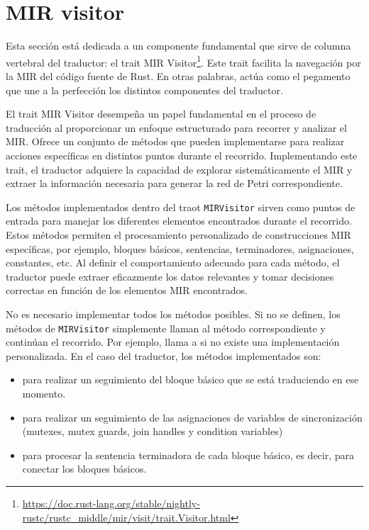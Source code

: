 \section{MIR visitor}

Esta sección está dedicada a un componente fundamental que sirve de columna vertebral del
traductor: el trait \acrshort{MIR} Visitor\footnote{\url{https://doc.rust-lang.org/stable/nightly-rustc/rustc_middle/mir/visit/trait.Visitor.html}}.
Este trait facilita la navegación por la \acrshort{MIR} del código
fuente de Rust. En otras palabras, actúa como el pegamento que une a la perfección los
distintos componentes del traductor.

El trait \acrshort{MIR} Visitor desempeña un papel fundamental en el proceso de traducción al
proporcionar un enfoque estructurado para recorrer y analizar el \acrshort{MIR}. Ofrece un conjunto de
métodos que pueden implementarse para realizar acciones específicas en distintos puntos
durante el recorrido. Implementando este trait, el traductor adquiere la capacidad de explorar
sistemáticamente el \acrshort{MIR} y extraer la información necesaria para generar la red de Petri
correspondiente.

Los métodos implementados dentro del traot \texttt{MIRVisitor} sirven como puntos de entrada
para manejar los diferentes elementos encontrados durante el recorrido. Estos métodos
permiten el procesamiento personalizado de construcciones \acrshort{MIR} específicas, por ejemplo,
bloques básicos, sentencias, terminadores, asignaciones, constantes, etc. Al definir el
comportamiento adecuado para cada método, el traductor puede extraer eficazmente los datos
relevantes y tomar decisiones correctas en función de los elementos \acrshort{MIR} encontrados.

No es necesario implementar todos los métodos posibles. Si no se definen, los métodos de
\texttt{MIRVisitor} simplemente llaman al método  correspondiente y continúan el recorrido. Por
ejemplo,  llama a  si no existe una implementación
personalizada. En el caso del traductor, los métodos implementados son:

\begin{itemize}
  \item {} para realizar un seguimiento del bloque básico que se está traduciendo en ese momento.
  \item {} para realizar un seguimiento de las asignaciones de variables de
        sincronización (mutexes, mutex guards, join handles y condition variables)
  \item {} para procesar la sentencia terminadora de cada bloque básico, es decir,
        para conectar los bloques básicos.
\end{itemize}

